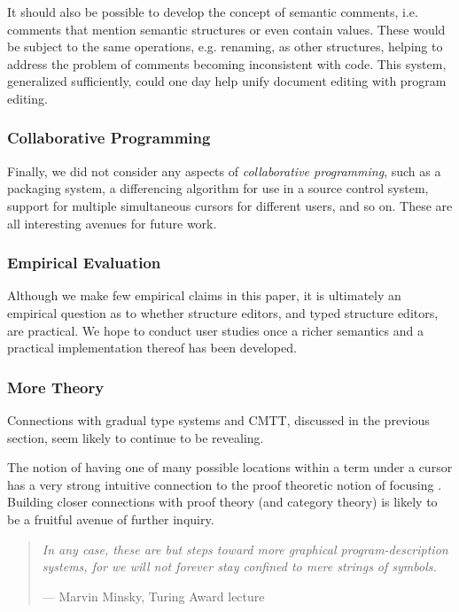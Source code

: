 \documentclass[9pt]{sigplanconf}
\begin{document}
It should also be possible to develop the concept of semantic comments,
i.e. comments that mention semantic structures or even contain values. These would be subject to
the same operations, e.g. renaming, as other structures, helping to address
the problem of comments becoming inconsistent with code. This system, generalized sufficiently,
could one day help unify document editing with program editing.

\subsubsection{Collaborative Programming}
Finally, we did not consider any aspects of \emph{collaborative
programming}, such as a packaging system, a differencing algorithm for use
in a source control system, support for multiple simultaneous cursors for
different users, and so on. These are all interesting avenues for future
work.

\subsubsection{Empirical Evaluation}
Although we make few empirical claims in this paper, it is ultimately an
empirical question as to whether structure editors, and typed structure
editors, are practical. We hope to conduct user studies once a richer
semantics and a practical implementation thereof has been developed.

\subsubsection{More Theory}
Connections with gradual type systems and CMTT, discussed in the previous
section, seem likely to continue to be revealing.

The notion of having one of many possible locations within a term under a
cursor has a very strong intuitive connection to the proof theoretic notion
of focusing \cite{Simmons11tr}. Building closer connections with proof
theory (and category theory) is likely to be a fruitful avenue of further
inquiry.

\begin{quote}
\emph{In any case, these are but steps toward more graphical program-description
systems, for we will not forever stay confined to mere strings of symbols.}

--- Marvin Minsky, Turing Award lecture \cite{DBLP:journals/jacm/Minsky70}
\end{quote}

\acks


\balance



% 
\end{document}
